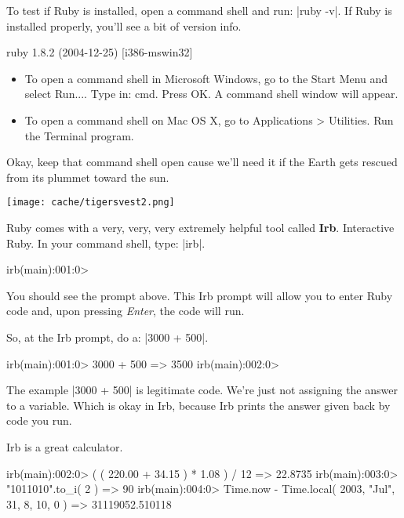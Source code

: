 \documentclass[12pt,twoside]{report}
\begin{document}
  To test if Ruby is installed, open a command shell and
run: \consoleinline|ruby -v|. If Ruby is installed
properly, you'll see a bit of version info.

\begin{consolecode}
 ruby 1.8.2 (2004-12-25) [i386-mswin32]
\end{consolecode}

\begin{itemize}

\item To open a command shell in Microsoft Windows, go to the Start Menu
and select Run.... Type in: cmd. Press OK. A command shell window will
appear.

\item To open a command shell on Mac OS X, go to Applications >
Utilities. Run the Terminal program.

\end{itemize}

Okay, keep that command shell open cause we'll need it if the Earth
gets rescued from its plummet toward the sun.

\newpage
\texttt{[image: cache/tigersvest2.png]}

Ruby comes with a very, very, very extremely helpful tool called
\textbf{Irb}. Interactive Ruby. In your command shell, type: 
\consoleinline|irb|.

\begin{consolecode}
 irb(main):001:0>
\end{consolecode}

You should see the prompt above. This Irb prompt will allow you to
enter Ruby code and, upon pressing \emph{Enter}, the code will run.

So, at the Irb prompt, do a: \consoleinline|3000 + 500|.

\begin{consolecode}
 irb(main):001:0> 3000 + 500
 => 3500
 irb(main):002:0>
\end{consolecode}

The example \consoleinline|3000 + 500| is legitimate
code. We're just not assigning the answer to a variable. Which is okay
in Irb, because Irb prints the answer given back by code you run.

Irb is a great calculator.

\begin{consolecode}
 irb(main):002:0> ( ( 220.00 + 34.15 ) * 1.08 ) / 12 
 => 22.8735
 irb(main):003:0> "1011010".to_i( 2 )
 => 90
 irb(main):004:0> Time.now - Time.local( 2003, "Jul", 31, 8, 10, 0 )
 => 31119052.510118
\end{consolecode}
\end{document}

